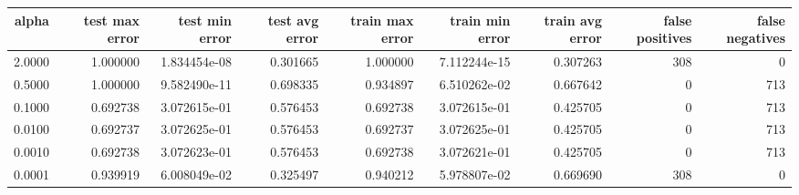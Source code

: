 
\begin{table}[ht]
\tiny
\begin{tabular}{rrrrrrrrr}
\toprule
 alpha &  test max error &  test min error &  test avg error &  train max error &  train min error &  train avg error &  false positives &  false negatives \\
\midrule
2.0000 &        1.000000 &    1.834454e-08 &        0.301665 &         1.000000 &     7.112244e-15 &         0.307263 &              308 &                0 \\
0.5000 &        1.000000 &    9.582490e-11 &        0.698335 &         0.934897 &     6.510262e-02 &         0.667642 &                0 &              713 \\
0.1000 &        0.692738 &    3.072615e-01 &        0.576453 &         0.692738 &     3.072615e-01 &         0.425705 &                0 &              713 \\
0.0100 &        0.692737 &    3.072625e-01 &        0.576453 &         0.692737 &     3.072625e-01 &         0.425705 &                0 &              713 \\
0.0010 &        0.692738 &    3.072623e-01 &        0.576453 &         0.692738 &     3.072621e-01 &         0.425705 &                0 &              713 \\
0.0001 &        0.939919 &    6.008049e-02 &        0.325497 &         0.940212 &     5.978807e-02 &         0.669690 &              308 &                0 \\
\bottomrule
\end{tabular}
\end{table}